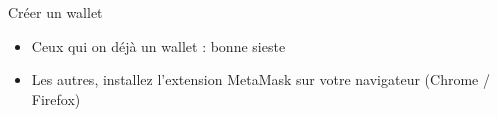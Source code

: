 \begin{frame}{Créer un wallet}
  \begin{itemize}
    \item Ceux qui on déjà un wallet : bonne sieste
    \item Les autres, installez l'extension MetaMask sur votre navigateur (Chrome / Firefox)
  \end{itemize}
\end{frame}